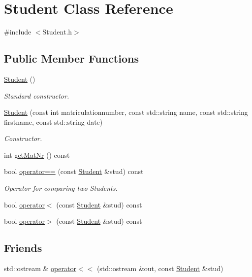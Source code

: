 \hypertarget{class_student}{}\section{Student Class Reference}
\label{class_student}


{\ttfamily \#include $<$Student.\+h$>$}

\subsection*{Public Member Functions}
\begin{DoxyCompactItemize}
\item 
\hypertarget{class_student_af9168cedbfa5565cf0b20c1a9d3f5c9d}{}\hyperlink{class_student_af9168cedbfa5565cf0b20c1a9d3f5c9d}{Student} ()\label{class_student_af9168cedbfa5565cf0b20c1a9d3f5c9d}

\begin{DoxyCompactList}\small\item\em Standard constructor. \end{DoxyCompactList}\item 
\hyperlink{class_student_a74ca15c6583b3831a815eb6711e95621}{Student} (const int matriculationnumber, const std\+::string name, const std\+::string firstname, const std\+::string date)
\begin{DoxyCompactList}\small\item\em Constructor. \end{DoxyCompactList}\item 
int \hyperlink{class_student_a2f19568b4e4c15b5140d69ac05fff536}{get\+Mat\+Nr} () const 
\item 
bool \hyperlink{class_student_a4e87a8bc21ffefa58283bccb576ad1d9}{operator==} (const \hyperlink{class_student}{Student} \&stud) const 
\begin{DoxyCompactList}\small\item\em Operator for comparing two Students. \end{DoxyCompactList}\item 
bool \hyperlink{class_student_a570dc9ac2ad826f894f48a79f27d110d}{operator$<$} (const \hyperlink{class_student}{Student} \&stud) const 
\item 
bool \hyperlink{class_student_a120227d21ee61415dd5dc162c79a2308}{operator$>$} (const \hyperlink{class_student}{Student} \&stud) const 
\end{DoxyCompactItemize}
\subsection*{Friends}
\begin{DoxyCompactItemize}
\item 
std\+::ostream \& \hyperlink{class_student_abce5a223540755844d2b3946bc682477}{operator$<$$<$} (std\+::ostream \&out, const \hyperlink{class_student}{Student} \&stud)
\end{DoxyCompactItemize}


